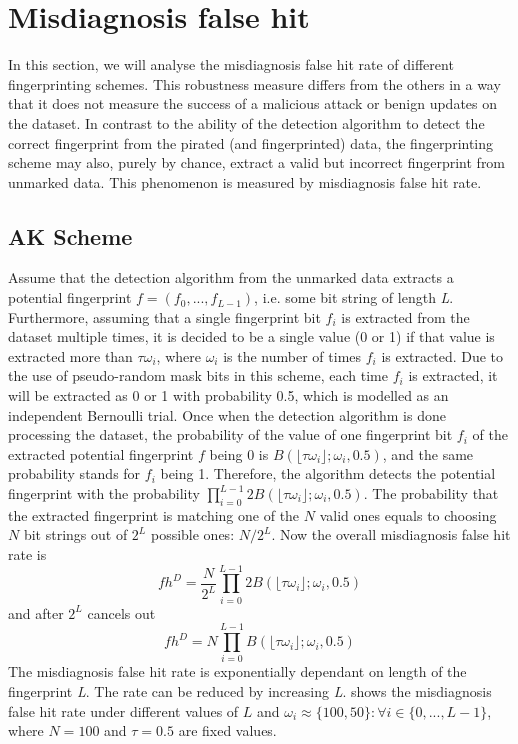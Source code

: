\section{Misdiagnosis false hit}
In this section, we will analyse the misdiagnosis false hit rate of different fingerprinting schemes. 
This robustness measure differs from the others in a way that it does not measure the success of a malicious attack or benign updates on the dataset. 
In contrast to the ability of the detection algorithm to detect the correct fingerprint from the pirated (and fingerprinted) data, the fingerprinting scheme may also, purely by chance, extract a valid but incorrect fingerprint from unmarked data.
This phenomenon is measured by misdiagnosis false hit rate.

\subsection{AK Scheme}\label{subsubsec:misdiagnosis-ak}
Assume that the detection algorithm from the unmarked data extracts a potential fingerprint $f=(f_0,...,f_{L-1})$, i.e. some bit string of length \textit{L}. 
Furthermore, assuming that a single fingerprint bit $f_i$ is extracted from the dataset multiple times, it is decided to be a single value (0 or 1) if that value is extracted more than $\tau\omega_i$, where $\omega_i$ is the number of times $f_i$ is extracted.
Due to the use of pseudo-random mask bits in this scheme, each time $f_i$ is extracted, it will be extracted as 0 or 1 with probability 0.5, which is modelled as an independent Bernoulli trial.
Once when the detection algorithm is done processing the dataset, the probability of the value of one fingerprint bit $f_i$ of the extracted potential fingerprint $f$ being 0 is $B(\lfloor\tau\omega_i\rfloor;\omega_i,0.5)$, and the same probability stands for $f_i$ being 1. 
Therefore, the algorithm detects the potential fingerprint with the probability $\prod_{i=0}^{L-1}2B(\lfloor\tau\omega_i\rfloor;\omega_i,0.5)$.
The probability that the extracted fingerprint is matching one of the $N$ valid ones equals to choosing $N$ bit strings out of $2^L$ possible ones: $N/2^L$.
Now the overall misdiagnosis false hit rate is 
\begin{equation}
    fh^D = \frac{N}{2^L}\prod_{i=0}^{L-1}2B(\lfloor\tau\omega_i\rfloor;\omega_i,0.5)
\end{equation}
and after $2^L$ cancels out 
\begin{equation}
    fh^D = N\prod_{i=0}^{L-1}B(\lfloor\tau\omega_i\rfloor;\omega_i,0.5)
\end{equation}
The misdiagnosis false hit rate is exponentially dependant on length of the fingerprint \textit{L}. The rate can be reduced by increasing \textit{L}.  shows the misdiagnosis false hit rate under different values of $L$ and $\omega_i \approx \{100,50\}: \forall i \in \{0,...,L-1\}$, where $N=100$ and $\tau=0.5$ are fixed values.

